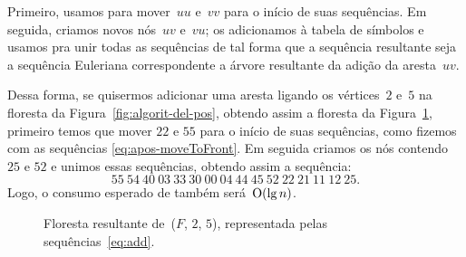 Primeiro, usamos \ETmovetofront{} para mover~$uu$ e~$vv$ para o início de suas sequências.
Em seguida, criamos novos nós~$uv$ e~$vu$; os adicionamos à tabela de símbolos e usamos \treapJoin{} pra unir todas as sequências de tal forma que a sequência resultante seja a sequência Euleriana correspondente a árvore resultante da adição da aresta~$uv$.

Dessa forma, se quisermos adicionar uma aresta ligando os vértices~$2$ e~$5$ na floresta da Figura~\ref{fig:algorit-del-pos}, obtendo assim a floresta da Figura~\ref{fig:algorit-add-pos}, primeiro temos que mover $22$ e $55$ para o início de suas sequências, como fizemos com as sequências \eqref{eq:apos-moveToFront}. Em seguida criamos os nós contendo $25$ e $52$ e unimos essas sequências, obtendo assim a sequência:
\begin{equation}
55~54~40~03~33~30~00~04~44~45~52~22~21~11~12~25.\label{eq:add}
\end{equation}
Logo, o consumo esperado de \dymForestAddEdge{} também será~$\mathrm{O}(\lg n)$.

\begin{figure}[htb]
\centering

\caption{Floresta resultante de~\dymForestAddEdge($F$, $2$, $5$), representada pelas sequências~\eqref{eq:add}.}
\label{fig:algorit-add-pos}
\end{figure}

